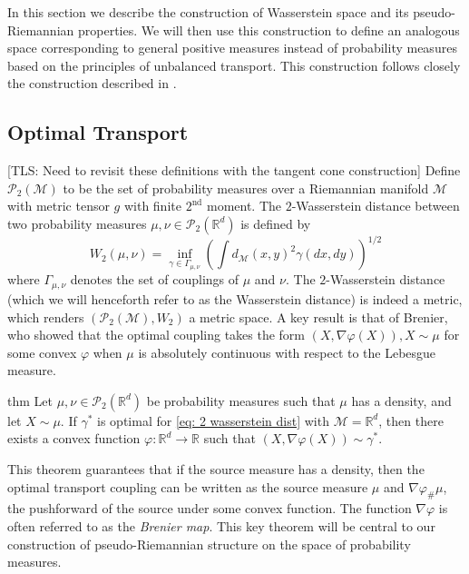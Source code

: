 \documentclass[11pt]{article}
\newcommand{\man}{\mathcal{M}}
\newcommand{\tls}[1]{{\color{cyan}[TLS: #1]}}
\begin{document}
In this section we describe the construction of Wasserstein space and its pseudo-Riemannian properties.  We will then use this construction to define an analogous space corresponding to general positive measures instead of probability measures based on the principles of unbalanced transport. This construction follows closely the construction described in \cite{clancy2021interpolating, chewi2024statisticaloptimaltransport, liero2018optimal, liero2016optimal, chizat2018interpolating, kondratyev2016newoptimaltransportdistance}.  

\subsection{Optimal Transport} \tls{Need to revisit these definitions with the tangent cone construction}
Define $\mathcal{P}_{2}(\man)$ to be the set of probability measures over a Riemannian manifold $\man$ with metric tensor $g$ with finite $2^{\text{nd}}$ moment. The $2$-Wasserstein distance between two probability measures $\mu, \nu \in \mathcal{P}_{2}(\mathbb{R}^d)$ is defined by
\begin{equation}
    W_2(\mu, \nu) = \inf_{\gamma \in \Gamma_{\mu, \nu}}\left(\int d_{\man}(x,y)^2\gamma(dx, dy)\right)^{1/2} \label{eq: 2 wasserstein dist}
\end{equation}
where $\Gamma_{\mu, \nu}$ denotes the set of couplings of $\mu$ and $\nu$. The $2$-Wasserstein distance (which we will henceforth refer to as the Wasserstein distance) is indeed a metric, which renders $(\mathcal{P}_{2}(\man), W_2)$ a metric space. A key result is that of Brenier, who showed that the optimal coupling takes the form $(X, \nabla \varphi(X)), X \sim \mu$ for some convex $\varphi$ when $\mu$ is absolutely continuous with respect to the Lebesgue measure.

\begin{restatable}[Brenier]{thm}{}
    Let $\mu, \nu \in \mathcal{P}_2(\mathbb{R}^d)$ be probability measures such that $\mu$ has a density, and let $X \sim \mu$. If $\gamma^*$ is optimal for \cref{eq: 2 wasserstein dist} with $\man = \mathbb{R}^d$, then there exists a convex function $\varphi:\mathbb{R}^d \rightarrow \mathbb{R}$ such that $(X, \nabla\varphi(X))\sim \gamma^*$. 
\end{restatable}

This theorem guarantees that if the source measure has a density, then the optimal transport coupling can be written as the source measure $\mu$ and $\nabla \varphi_\#\mu$, the pushforward of the source under some convex function. The function $\nabla\varphi$ is often referred to as the \textit{Brenier map}. This key theorem will be central to our construction of pseudo-Riemannian structure on the space of probability measures. 
\end{document}
